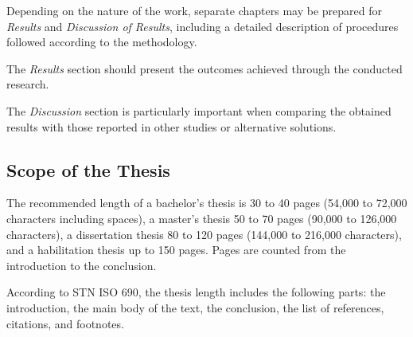 Depending on the nature of the work, separate chapters may be prepared for \textit{Results} and \textit{Discussion of Results}, including a detailed description of procedures followed according to the methodology. 

The \textit{Results} section should present the outcomes achieved through the conducted research.

The \textit{Discussion} section is particularly important when comparing the obtained results with those reported in other studies or alternative solutions.

\subsection{Scope of the Thesis}

The recommended length of a bachelor's thesis is 30 to 40 pages (54,000 to 72,000 characters including spaces), a master's thesis 50 to 70 pages (90,000 to 126,000 characters), a dissertation thesis 80 to 120 pages (144,000 to 216,000 characters), and a habilitation thesis up to 150 pages. Pages are counted from the introduction to the conclusion. 

According to STN ISO 690, the thesis length includes the following parts: the introduction, the main body of the text, the conclusion, the list of references, citations, and footnotes.